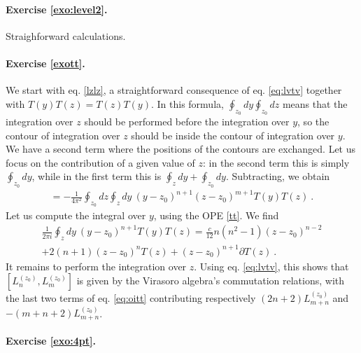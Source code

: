 \documentclass[12pt, a4paper]{article}
\theoremstyle{break}
\begin{document}
\paragraph{Exercise \ref{exo:level2}.} 

Straighforward calculations.

\paragraph{Exercise \ref{exott}.} We start with eq. \eqref{lzlz}, a straightforward consequence of eq. \eqref{eq:lvtv} together with $T(y)T(z)=T(z)T(y)$. In this formula, $\oint_{z_0} dy \oint_{z_0} dz$ means that the integration over $z$ should be performed before the integration over $y$, so the contour of integration over $z$ should be inside the contour of integration over $y$. We have a second term where the positions of the contours are exchanged. Let us focus on the contribution of a given value of $z$: in the second term this is simply $\oint_{z_0} dy$, while in the first term this is $\oint_{z} dy + \oint_{z_0} dy$. Subtracting, we obtain 
\begin{align}
 [L_n^{(z_0)},L_m^{(z_0)}] = -\frac{1}{4\pi^2} \oint_{z_0} dz \oint_{z} dy\  (y-z_0)^{n+1}(z-z_0)^{m+1} T(y)T(z)\ .
\end{align}
Let us compute the integral over $y$, using the OPE \eqref{tt}. We find 
\begin{multline}
 \frac{1}{2\pi i} \oint_z dy\ (y-z_0)^{n+1} T(y)T(z) = \frac{c}{12} n(n^2-1) (z-z_0)^{n-2} 
 \\
 +2(n+1)(z-z_0)^n T(z) + (z-z_0)^{n+1} \partial T(z)\ .
 \label{eq:oitt}
\end{multline}
It remains to perform the integration over $z$. Using eq. \eqref{eq:lvtv}, this shows that $[L_n^{(z_0)},L_m^{(z_0)}]$ is given by the Virasoro algebra's commutation relations, with the last two terms of eq. \eqref{eq:oitt} contributing respectively $(2n+2)L_{m+n}^{(z_0)}$ and $-(m+n+2)L_{m+n}^{(z_0)}$.

\paragraph{Exercise \ref{exo:4pt}.} 
\end{document}
